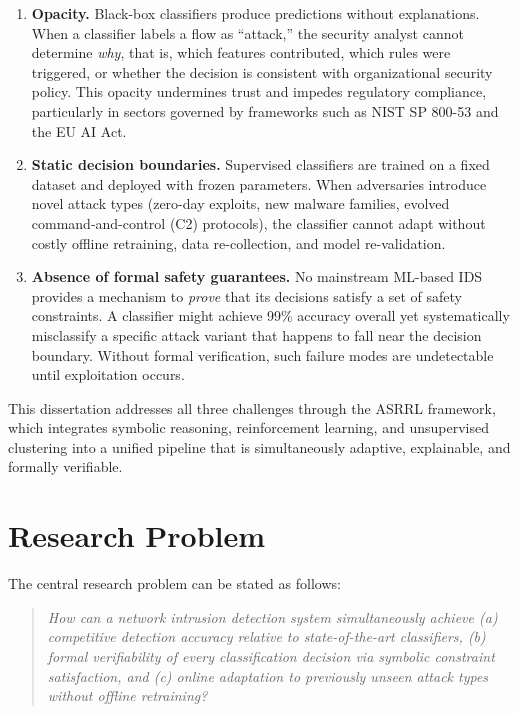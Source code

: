 \documentclass[12pt, letterpaper, oneside]{report}
\newcommand{\ASRRL}{\textsc{ASRRL}}
\begin{document}
\begin{enumerate}[label=(\arabic*)]
    \item \textbf{Opacity.} Black-box classifiers produce predictions without explanations. When a classifier labels a flow as ``attack,'' the security analyst cannot determine \emph{why}, that is, which features contributed, which rules were triggered, or whether the decision is consistent with organizational security policy. This opacity undermines trust and impedes regulatory compliance, particularly in sectors governed by frameworks such as NIST SP 800-53 and the EU AI Act.

    \item \textbf{Static decision boundaries.} Supervised classifiers are trained on a fixed dataset and deployed with frozen parameters. When adversaries introduce novel attack types (zero-day exploits, new malware families, evolved command-and-control (C2) protocols), the classifier cannot adapt without costly offline retraining, data re-collection, and model re-validation.

    \item \textbf{Absence of formal safety guarantees.} No mainstream ML-based IDS provides a mechanism to \emph{prove} that its decisions satisfy a set of safety constraints. A classifier might achieve 99\% accuracy overall yet systematically misclassify a specific attack variant that happens to fall near the decision boundary. Without formal verification, such failure modes are undetectable until exploitation occurs.
\end{enumerate}

This dissertation addresses all three challenges through the \ASRRL{} framework, which integrates symbolic reasoning, reinforcement learning, and unsupervised clustering into a unified pipeline that is simultaneously adaptive, explainable, and formally verifiable.


\section{Research Problem}
\label{sec:research_problem}

The central research problem can be stated as follows:

\begin{quote}
\emph{How can a network intrusion detection system simultaneously achieve (a) competitive detection accuracy relative to state-of-the-art classifiers, (b) formal verifiability of every classification decision via symbolic constraint satisfaction, and (c) online adaptation to previously unseen attack types without offline retraining?}
\end{quote}
\end{document}

